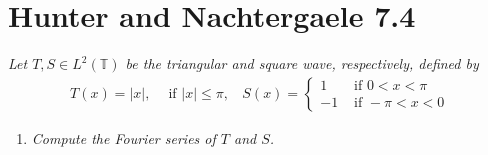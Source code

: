 \documentclass[12pt]{article}
\theoremstyle{plain}
\begin{document}
\section*{Hunter and Nachtergaele 7.4}
\emph{Let $T, S \in L^2(\mathbb{T})$ be the triangular and square wave, respectively, defined by}
\begin{align*}
    T(x) = |x|,\ \ \ \ \text{ if } |x| \leq \pi,\ \ \ \ S(x) = \begin{cases}
        1 & \text{ if } 0 < x < \pi \\
        -1 & \text{ if } -\pi < x < 0
    \end{cases}
\end{align*}
\begin{enumerate}[\bf (a)]
    \item
        \emph{Compute the Fourier series of $T$ and $S$.} \\


\end{enumerate}
\end{document}
